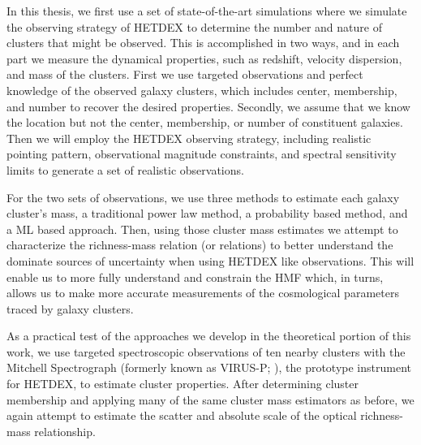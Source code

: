 In this thesis, we first use a set of state-of-the-art simulations where we simulate the observing strategy of HETDEX to determine the number and nature of clusters that might be observed. This is accomplished in two ways, and in each part we measure the dynamical properties, such as redshift, velocity dispersion, and mass of the clusters. First we use targeted observations and perfect knowledge of the observed galaxy clusters, which includes center, membership, and number to recover the desired properties. Secondly, we assume that we know the location but not the center, membership, or number of constituent galaxies. Then we will employ the HETDEX observing strategy, including realistic pointing pattern, observational magnitude constraints, and spectral sensitivity limits to generate a set of realistic observations.

For the two sets of observations, we use three methods to estimate each galaxy cluster's mass, a traditional power law method, a probability based method, and a ML based approach. Then, using those cluster mass estimates we attempt to characterize the richness-mass relation (or relations) to better understand the dominate sources of uncertainty when using HETDEX like observations. This will enable us to more fully understand and constrain the HMF which, in turns, allows us to make more accurate measurements of the cosmological parameters traced by galaxy clusters.

As a practical test of the approaches we develop in the theoretical portion of this work, we use targeted spectroscopic observations of ten nearby clusters with the Mitchell Spectrograph (formerly known as VIRUS-P; \citealt{Hill2008a}), the prototype instrument for HETDEX, to estimate cluster properties. After determining cluster membership and applying many of the same cluster mass estimators as before, we again attempt to estimate the scatter and absolute scale of the optical richness-mass relationship.
